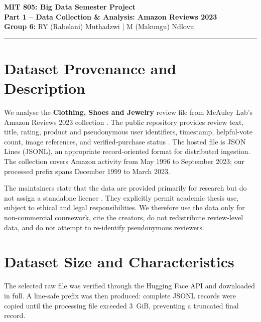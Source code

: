 \documentclass[10pt,a4paper]{article}
\begin{document}
\begin{center}
{\large\textbf{MIT 805: Big Data Semester Project}}\\[-1pt]
{\normalsize\textbf{Part 1 -- Data Collection \& Analysis: Amazon Reviews 2023}}\\[2pt]
\textbf{Group 6:} RY (Rabelani) Muthadzwi \quad | \quad M (Makungu) Ndlovu
\end{center}
\vspace{-2mm}\hrule\vspace{1.5mm}

\section{Dataset Provenance and Description}
We analyse the \textbf{Clothing, Shoes and Jewelry} review file from McAuley Lab's Amazon Reviews 2023 collection \cite{hou2024}. The public repository provides review text, title, rating, product and pseudonymous user identifiers, timestamp, helpful-vote count, image references, and verified-purchase status \cite{amazonhf}. The hosted file is JSON Lines (JSONL), an appropriate record-oriented format for distributed ingestion. The collection covers Amazon activity from May 1996 to September 2023; our processed prefix spans December 1999 to March 2023.

The maintainers state that the data are provided primarily for research but do not assign a standalone licence \cite{terms}. They explicitly permit academic thesis use, subject to ethical and legal responsibilities. We therefore use the data only for non-commercial coursework, cite the creators, do not redistribute review-level data, and do not attempt to re-identify pseudonymous reviewers.

\section{Dataset Size and Characteristics}
The selected raw file was verified through the Hugging Face API and downloaded in full. A line-safe prefix was then produced: complete JSONL records were copied until the processing file exceeded 3~GiB, preventing a truncated final record.
\end{document}
